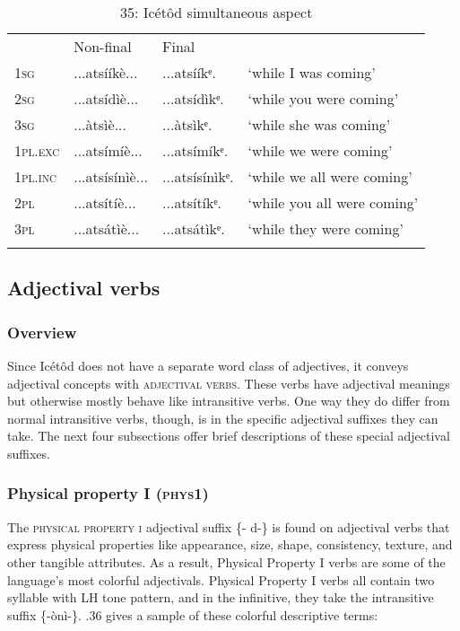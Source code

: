 \begin{table}
\caption{35: Icétôd simultaneous aspect}
\label{tab:8}


\begin{tabularx}{\textwidth}{XXXX} & Non-final & Final & \\
\lsptoprule
\textsc{1sg} & ...atsííkè... & ...atsííkᵉ. & ‘while I was coming’\\
\textsc{2sg} & ...atsídìè... & ...atsídìkᵉ. & ‘while you were coming’\\
\textsc{3sg} & ...àtsìè... & ...àtsìkᵉ. & ‘while she was coming’\\
\textsc{1pl.exc} & ...atsímíè... & ...atsímíkᵉ. & ‘while we were coming’\\
\textsc{1pl.inc} & ...atsísínìè... & ...atsísínìkᵉ. & ‘while we all were coming’\\
\textsc{2pl} & ...atsítíè... & ...atsítíkᵉ. & ‘while you all were coming’\\
\textsc{3pl} & ...atsátìè... & ...atsátìkᵉ. & ‘while they were coming’\\
\lspbottomrule
\end{tabularx}
\end{table}



\subsection{Adjectival verbs}
\subsubsection{Overview}

Since Icétôd does not have a separate word class of adjectives, it conveys adjectival concepts with \textsc{adjectival verbs}. These verbs have adjectival meanings but otherwise mostly behave like intransitive verbs. One way they do differ from normal intransitive verbs, though, is in the specific adjectival suffixes they can take. The next four subsections offer brief descriptions of these special adjectival suffixes.


\subsubsection{Physical property I (\textsc{phys1})}

The \textsc{physical property i} adjectival suffix \{- d-\} is found on adjectival verbs that express physical properties like appearance, size, shape, consistency, texture, and other tangible attributes. As a result, Physical Property I verbs are some of the language’s most colorful adjectivals. Physical Property I verbs all contain two syllable with LH tone pattern, and in the infinitive, they take the intransitive suffix \{-ònì-\}. .36 gives a sample of these colorful descriptive terms:


